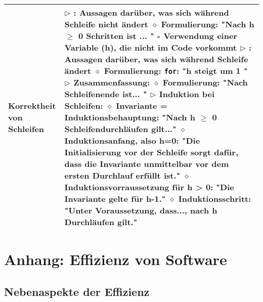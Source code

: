 \begin{longtable}{ | p{} p{} | }
	\makecell[l]{Korrektheit von \\ Schleifen} & \makecell[l]{
	$\triangleright$ {\makebox[3.2cm][l]{Schleifeninvariante}}: Aussagen darüber, was sich während Schleife nicht ändert \\
	\hspace{0.4cm} $\diamond$ Formulierung: \string"Nach h $\geq$ 0 Schritten ist ... \string" \\
	\hspace{0.6cm} - Verwendung einer Variable (h), die nicht im Code vorkommt \\
	$\triangleright$ {\makebox[3.2cm][l]{Schleifenvariante}}: Aussagen darüber, was sich während Schleife ändert \\
	\hspace{0.4cm} $\diamond$ Formulierung: \texttt{for}: \string"h steigt um 1 \string"
	$\triangleright$ Zusammenfassung: \\
	\hspace{0.4cm} $\diamond$ Formulierung: \string"Nach Schleifenende ist... \string" \\
	$\triangleright$ Induktion bei Schleifen: \\
	\hspace{0.4cm} $\diamond$ Invariante = Induktionsbehauptung: \string"Nach h $\geq$ 0 Schleifendurchläufen gilt...\string" \\
	\hspace{0.4cm} $\diamond$ Induktionsanfang, also h=0: \string"Die Initialisierung vor der Schleife sorgt dafür, \\ 
	\hspace{0.8cm} dass die Invariante unmittelbar vor dem ersten Durchlauf erfüllt ist.\string" \\
	\hspace{0.4cm} $\diamond$ Induktionsvorraussetzung für h > 0: "Die Invariante gelte für h-1." \\
	\hspace{0.4cm} $\diamond$ Induktionsschritt: \string"Unter Voraussetzung, dass..., nach h Durchläufen gilt.\string"} \\ \hline

	\end{longtable}


\section{Anhang: Effizienz von Software} 

\subsection*{Nebenaspekte der Effizienz} 

